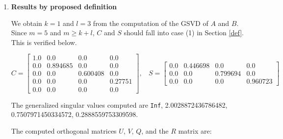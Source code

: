     \begin{enumerate}[(1).]
        \item \textbf{Results by proposed definition}
            
            We obtain $k = 1$ and $l = 3$ from the computation of the GSVD of $A$ and $B$. Since $m = 5$ and $m \geq k+l$, $C$ and $S$ should fall into case (1) in Section \ref{def}. This is verified below. 
            
            \begin{equation*}
                C = \begin{bmatrix}
                    1.0 & 0.0      & 0.0      & 0.0  \\
                    0.0 & 0.894685 & 0.0      & 0.0  \\  
                    0.0 & 0.0      & 0.600408 & 0.0  \\  
                    0.0 & 0.0      & 0.0      & 0.27751 \\
                    0.0 & 0.0      & 0.0      & 0.0    
                \end{bmatrix} , \ \ \ \
                S = \begin{bmatrix}
                    0.0 & 0.446698 & 0.0      & 0.0   \\  
                    0.0 & 0.0      & 0.799694 & 0.0     \\
                    0.0 & 0.0      & 0.0      & 0.960723
                \end{bmatrix}
            \end{equation*}

            The generalized singular values computed are \texttt{Inf}, 2.0028872436786482, 0.7507971450334572, 0.2888559753309598.

            The computed orthogonal matrices $U$, $V$, $Q$, and the $R$ matrix are: 
    

\end{enumerate}
